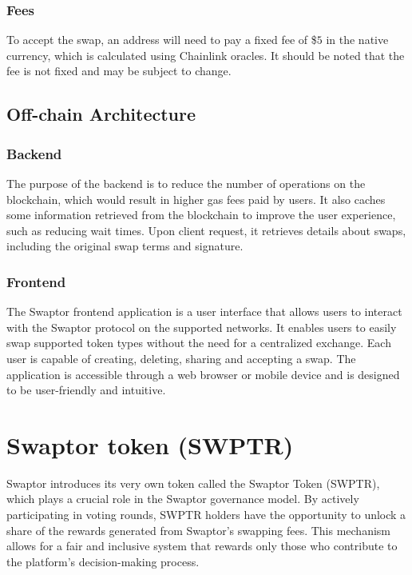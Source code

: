 \documentclass[12pt]{article}
\begin{document}
\subsubsection{Fees}
To accept the swap, an address will need to pay a fixed fee of \$$5$ in the native currency, which is calculated using Chainlink oracles\cite{chainlink}. It should be noted that the fee is not fixed and may be subject to change.

\subsection{Off-chain Architecture}

\subsubsection{Backend}
The purpose of the backend is to reduce the number of operations on the blockchain,
which would result in higher gas fees paid by users. It also caches some information
retrieved from the blockchain to improve the user experience, such as reducing wait
times. Upon client request, it retrieves details about swaps, including the original
swap terms and signature.

\subsubsection{Frontend}
The Swaptor frontend application is a user interface that allows users to interact
with the Swaptor protocol on the supported networks. It enables users to easily swap
supported token types without the need for a centralized exchange. Each user is capable
of creating, deleting, sharing and accepting a swap. The application is accessible through a
web browser or mobile device and is designed to be user-friendly and intuitive.

\section{Swaptor token (SWPTR)}

Swaptor introduces its very own token called the Swaptor Token (SWPTR), which plays a
crucial role in the Swaptor governance model. By actively participating in voting rounds,
SWPTR holders have the opportunity to unlock a share of the rewards generated from Swaptor's swapping fees.
This mechanism allows for a fair and inclusive system that rewards only those who contribute to the platform's decision-making process.
\end{document}
